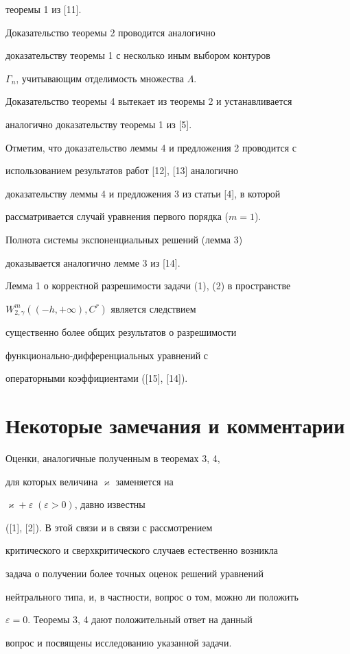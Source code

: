 теоремы 1 из [11].


Доказательство теоремы 2 проводится аналогично


доказательству теоремы 1 с несколько иным выбором контуров


$\Gamma_n$, учитывающим отделимость множества $\Lambda$.


Доказательство теоремы 4 вытекает из теоремы 2 и устанавливается


аналогично доказательству теоремы 1 из [5].





Отметим, что доказательство леммы 4 и предложения 2 проводится с


использованием результатов работ [12], [13] аналогично


доказательству леммы 4 и предложения 3 из статьи [4], в которой


рассматривается случай уравнения первого порядка ($m=1$).


Полнота системы экспоненциальных решений (лемма 3)


доказывается аналогично лемме 3 из [14].





Лемма 1 о корректной разрешимости задачи (1), (2) в пространстве


$W_{2,\gamma}^m((-h,+\infty),C^r)$ является следствием


существенно более общих результатов о разрешимости


функционально-дифференциальных уравнений с


операторными коэффициентами ([15], [14]).








\section{Некоторые замечания и комментарии}





\begin{note}


Оценки, аналогичные полученным в теоремах 3, 4, 


для которых величина $\varkappa$ заменяется на


$\varkappa+\varepsilon\;(\varepsilon>0)$, давно известны


([1], [2]). В этой связи и в связи с рассмотрением


критического и сверхкритического случаев естественно возникла


задача о получении более точных оценок решений уравнений


нейтрального типа, и, в частности, вопрос о том, можно ли положить


$\varepsilon=0$. Теоремы 3, 4 дают положительный ответ на данный


вопрос и посвящены исследованию указанной задачи.


\end{note}





